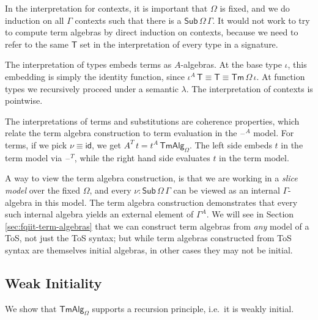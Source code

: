 \documentclass[12pt,a4paper,twoside,openany]{book}
\theoremstyle{remark}
\theoremstyle{definition}
\theoremstyle{theorem}
\newcommand{\ms}[1]{\mathsf{#1}}
\newcommand{\id}{\mathsf{id}}
\newcommand{\Sub}{\mathsf{Sub}}
\newcommand{\Tm}{\mathsf{Tm}}
\newcommand{\blank}{\mathord{\hspace{1pt}\text{--}\hspace{1pt}}}
\newcommand{\TmAlg}{\ms{TmAlg}}
\begin{document}
In the interpretation for contexts, it is important that $\Omega$ is
fixed, and we do induction on all $\Gamma$ contexts such that there is a
$\Sub\,\Omega\,\Gamma$. It would not work to try to compute term algebras by
direct induction on contexts, because we need to refer to the same $\ms{T}$ set
in the interpretation of every type in a signature.

The interpretation of types embeds terms as $A$-algebras. At the base type
$\iota$, this embedding is simply the identity function, since $\iota^A\,\ms{T}
\equiv \ms{T} \equiv \Tm\,\Omega\,\iota$. At function types we recursively proceed
under a semantic $\lambda$. The interpretation of contexts is pointwise.

The interpretations of terms and substitutions are coherence properties, which
relate the term algebra construction to term evaluation in the $\blank^A$ model.
For terms, if we pick $\nu \equiv \id$, we get $A^T\,t =
t^A\,\TmAlg_{\Omega}$. The left side embeds $t$ in the term model via
$\blank^T$, while the right hand side evaluates $t$ in the term model.

A way to view the term algebra construction, is that we are working in a
\emph{slice model} over the fixed $\Omega$, and every $\nu :
\Sub\,\Omega\,\Gamma$ can be viewed as an internal $\Gamma$-algebra in this
model. The term algebra construction demonstrates that
every such internal algebra yields an external element of $\Gamma^A$. We will
see in Section \ref{sec:fqiit-term-algebras} that we can construct term algebras
from \emph{any} model of a ToS, not just the ToS syntax; but while term algebras
constructed from ToS syntax are themselves initial algebras, in other cases they
may not be initial.

\subsection{Weak Initiality}
\label{sec:simple-weak-initiality}
We show that $\TmAlg_{\Omega}$ supports a recursion principle, i.e.\ it is weakly
initial.
\end{document}
